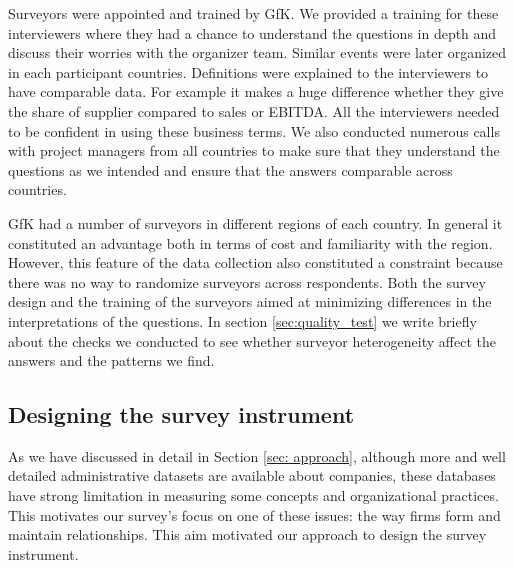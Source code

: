 \usepackage{}\documentclass[final, dvipsnames, authoryear,12pt]{elsarticle}
\begin{document}

Surveyors were appointed and trained by GfK. We provided a training for these interviewers where they had a chance to understand the questions in depth and discuss their worries with the organizer team. Similar events were later organized in each participant countries. Definitions were explained to the interviewers to have comparable data. For example it makes a huge difference whether they give the share of supplier compared to sales or EBITDA. All the interviewers needed to be confident in using these business terms. We also conducted numerous calls with project managers from all countries to make sure that they understand the questions as we intended and ensure that the answers comparable across countries. 

GfK had a number of surveyors in different regions of each country. In general it constituted an advantage both in terms of cost and familiarity with the region. However, this feature of the data collection also constituted a constraint because there was no way to randomize surveyors across respondents. Both the survey design and the training of the surveyors aimed at minimizing differences in the interpretations of the questions. In section \ref{sec:quality_test} we write briefly about the checks we conducted to see whether surveyor heterogeneity affect the answers and the patterns we find.





\subsection{Designing the survey instrument}

As we have discussed in detail in Section \ref{sec: approach}, although more and well detailed administrative datasets are available about companies, these databases have strong limitation in measuring some concepts and organizational practices. This motivates our survey's focus on one of these issues: the way firms form and maintain relationships. This aim motivated our approach to design the survey instrument.
\end{document}
